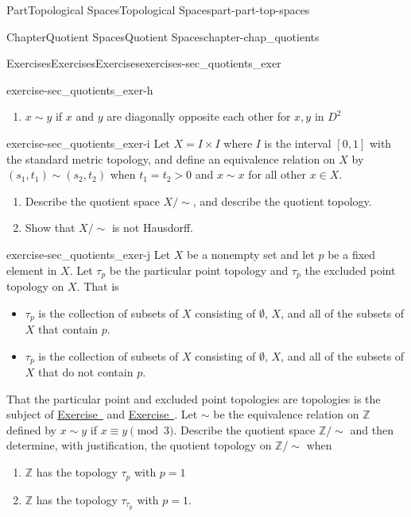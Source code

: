 \documentclass[oneside,10pt,]{book}
\newcommand{\xreffont}{\relax}
\numberwithin{equation}{chapter}
\newcommand{\Z}{\mathbb{Z}}
\newcommand{\ssim}{\sim}
\newcommand{\gt}{>}
\begin{document}
\begin{partptx}{Part}{Topological Spaces}{}{Topological Spaces}{}{}{part-part-top-spaces}
\begin{chapterptx}{Chapter}{Quotient Spaces}{}{Quotient Spaces}{}{}{chapter-chap_quotients}
\begin{exercises-section}{Exercises}{Exercises}{}{Exercises}{}{}{exercises-sec_quotients_exer}
\begin{divisionexercise}{7}{}{}{exercise-sec_quotients_exer-h}
\begin{enumerate}[font=\bfseries,label=(\alph*),ref=\alph*]
\item{}\(x \sim y\) if \(x\) and \(y\) are diagonally opposite each other for \(x,
y\) in \(D^2\)%
\end{enumerate}%
\end{divisionexercise}%
\begin{divisionexercise}{8}{}{}{exercise-sec_quotients_exer-i}%
Let \(X = I \times I\) where \(I\) is the interval \([0,1]\) with the standard metric topology, and define an equivalence relation on \(X\) by \((s_1, t_1) \sim (s_2,t_2)\) when \(t_1 = t_2 \gt 0\) and \(x \sim x\) for all other \(x \in X\).%
\begin{enumerate}[font=\bfseries,label=(\alph*),ref=\alph*]%
\item{}Describe the quotient space \(X/\ssim\), and describe the quotient topology.%
\item{}Show that \(X/\ssim\) is not Hausdorff.%
\end{enumerate}%
\end{divisionexercise}%
\begin{divisionexercise}{9}{}{}{exercise-sec_quotients_exer-j}%
Let \(X\) be a nonempty set and let \(p\) be a fixed element in \(X\). Let \(\tau_p\) be the particular point topology and \(\tau_{\overline{p}}\) the excluded point topology on \(X\). That is%
\begin{itemize}[label=\textbullet]
\item{}\(\tau_{p}\) is the collection of subsets of \(X\) consisting of \(\emptyset\), \(X\), and all of the subsets of \(X\) that contain \(p\).%
\item{}\(\tau_{\overline{p}}\) is the collection of subsets of \(X\) consisting of \(\emptyset\), \(X\), and all of the subsets of \(X\) that do not contain \(p\).%
\end{itemize}
That the particular point and excluded point topologies are topologies is the subject of \hyperlink{exercise-ex_particular_point_topology}{Exercise~{\xreffont 9}} and \hyperlink{exercise-ex_excluded_point_topology}{Exercise~{\xreffont 10}}. Let \(\sim\) be the equivalence relation on \(\Z\) defined by \(x \sim y\) if \(x \equiv y \pmod{3}\). Describe the quotient space \(\Z/\ssim\) and then determine, with justification, the quotient topology on \(\Z/\ssim\) when%
\begin{enumerate}[font=\bfseries,label=(\alph*),ref=\alph*]%
\item{}\(\Z\) has the topology \(\tau_{p}\) with \(p = 1\)%
\item{}\(\Z\) has the topology \(\tau_{\tau_{\overline{p}}}\) with \(p = 1\).%

\end{enumerate}
\end{divisionexercise}
\end{exercises-section}
\end{chapterptx}
\end{partptx}
\end{document}
